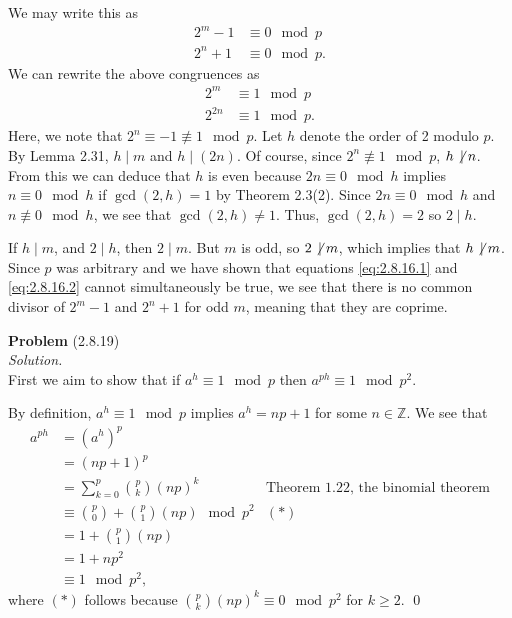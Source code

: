 \documentclass[12 pt]{amsart}
\begin{document}
  We may write this as 
  \begin{align}
    \label{eq:2.8.16.1}
    2^m - 1 & \equiv 0 \mod p \\
    \label{eq:2.8.16.2}
    2^n + 1 & \equiv 0 \mod p. 
  \end{align}
  We can rewrite the above congruences as
  \begin{align*}
    2^m  & \equiv 1 \mod p \\
    2^{2n} & \equiv 1 \mod p. 
  \end{align*}
  Here, we note that $2^n \equiv -1 \not \equiv 1 \mod p$. 
  Let $h$ denote the order of 2 modulo $p$.
  By Lemma 2.31, $h \mid m$ and $h \mid (2n)$. 
  Of course, since $2^n \not \equiv 1 \mod p$, $h \not \, \mid n$. 
  From this we can deduce that $h$ is even because
  $2n \equiv 0 \mod h$ implies $n \equiv 0 \mod h$ if
  $\gcd(2, h) = 1$ by Theorem 2.3(2). 
  Since $2n \equiv 0 \mod h$ and $n \not \equiv 0 \mod h$,
  we see that
  $\gcd(2,h) \neq 1$.
  Thus, $\gcd(2,h) = 2$ so $2 \mid h$.

  If $h \mid m$, and $2 \mid h$, then $2 \mid m$.
  But $m$ is odd, so $2 \not \, \mid m$, which implies that
  $h \not \, \mid m$. 
  Since $p$ was arbitrary and we have shown that 
  equations \ref{eq:2.8.16.1} and \ref{eq:2.8.16.2}
  cannot simultaneously be true, we see that there is no 
  common divisor of 
  $2^m - 1$ and $2^n + 1$ for odd $m$, meaning that
  they are coprime. 
\vfill
\newpage



\phantom{\quad} \vfill
\noindent
\textbf{Problem} (2.8.19) \\[4ex]
\emph{Solution.} \\[2ex]
  First we aim to show that if 
  $a^h \equiv 1 \mod p$ 
  then
  $a^{ph} \equiv 1 \mod p^2$.

  By definition, $a^h \equiv 1 \mod p$ implies
  $a^h = np + 1$ for some $n \in \mathbb{Z}$. 
  We see that
  \begin{align*}
    a^{ph} &= \left( a^h \right)^p \\
           &= (np + 1)^p \\
           &= \sum_{k = 0}^p \binom{p}{k}(np)^k 
              & \text{Theorem 1.22, the binomial theorem} \\
          &\equiv \binom{p}{0} + \binom{p}{1}(np) \mod p^2 & (*) \\
          &= 1 + \binom{p}{1}(np) \\
          &= 1 + np^2 \\
          &\equiv 1 \mod p^2,
  \end{align*}
  where $(*)$ follows because 
  $\binom{p}{k}(np)^k \equiv 0 \mod p^2$ for
  $k \geq 2$.
  \qed
\end{document}
